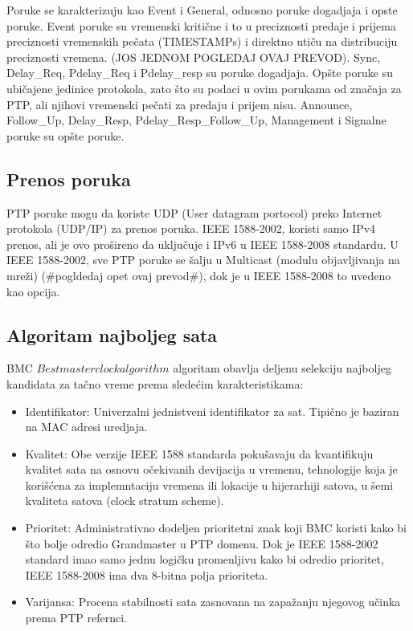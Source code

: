 \documentclass[a4paper,12pt, master]{etf}
\begin{document}
	Poruke se karakterizuju kao Event i General, odnosno poruke dogadjaja i opste poruke. Event
	poruke su vremenski kriti\v{c}ne i to u preciznosti predaje i prijema preciznosti vremenskih
	pe\v{c}ata (TIMESTAMPs) i direktno uti\v{c}u na distribuciju preciznosti vremena. (JOS JEDNOM
	POGLEDAJ OVAJ PREVOD). Sync, Delay\_Req, Pdelay\_Req i Pdelay\_resp su poruke dogadjaja.
	Op\v{s}te poruke su ubi\v{c}ajene jedinice protokola, zato \v{s}to su podaci u ovim porukama od
	zna\v{c}aja za PTP, ali njihovi vremenski pe\v{c}ati za predaju i prijem nisu. Announce, Follow\_Up,
	Delay\_Resp, Pdelay\_Resp\_Follow\_Up, Management i Signalne poruke su op\v{s}te poruke.

        \subsection{Prenos poruka}

	PTP poruke mogu da koriste UDP (User datagram portocol) preko Internet protokola (UDP/IP)
	za prenos poruka. IEEE 1588-2002, koristi samo IPv4 prenos, ali je ovo pro\v{s}ireno da
	uklju\v{c}uje i IPv6 u IEEE 1588-2008 standardu. U IEEE 1588-2002, sve PTP poruke se \v{s}alju u
	Multicast (modulu objavljivanja na mre\v{z}i) (\#pogldedaj opet ovaj prevod\#), dok je u IEEE
	1588-2008 to uvedeno kao opcija.

	\subsection{Algoritam najboljeg sata}
        BMC \(Best master clock algorithm\) algoritam obavlja deljenu selekciju najboljeg kandidata
        za ta\v{c}no vreme prema slede\'{c}im karakteristikama:

        \begin{itemize}
            \item Identifikator: Univerzalni jednistveni identifikator za sat. Tipi\v{c}no je baziran
            na MAC adresi uredjaja.
            \item Kvalitet: Obe verzije IEEE 1588 standarda poku\v{s}avaju da kvantifikuju kvalitet sata
            na osnovu o\v{c}ekivanih devijacija u vremenu, tehnologije koja je kori\v{s}\'{c}ena za
            implemntaciju vremena ili lokacije u hijerarhiji satova, u \v{s}emi kvaliteta satova
            (clock stratum scheme).
            \item Prioritet: Administrativno dodeljen prioritetni znak koji BMC koristi kako bi \v{s}to
            bolje odredio Grandmaster u PTP domenu. Dok je IEEE 1588-2002 standard imao samo jednu logi\v{c}ku
                promenljivu kako bi odredio prioritet, IEEE 1588-2008 ima dva 8-bitna polja prioriteta.
            \item Varijansa: Procena stabilnosti sata zasnovana na zapa\v{z}anju njegovog u\v{c}inka prema PTP
                refernci.
        \end{itemize}
\end{document}
